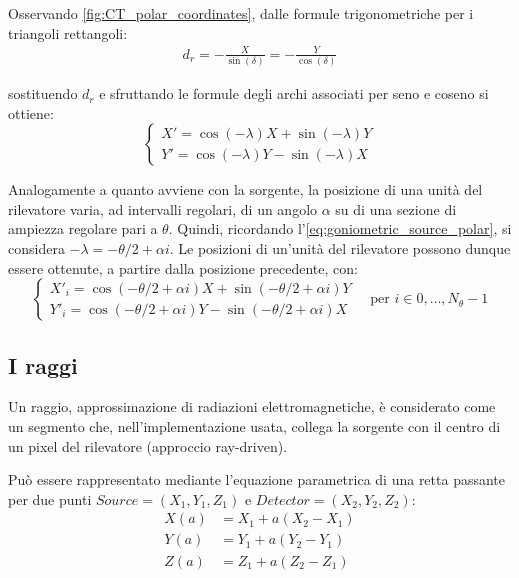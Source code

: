 \documentclass[12pt,a4paper]{report}
\begin{document}
Osservando \autoref{fig:CT_polar_coordinates}, dalle formule trigonometriche per i triangoli rettangoli:
\begin{align*}
  d_r = -\frac{X}{\sin(\delta)} = -\frac{Y}{\cos(\delta)}
\end{align*}

sostituendo \(d_r\) e sfruttando le formule degli archi associati per seno e coseno si ottiene:
\begin{equation*}
  \begin{cases}
    X' = \cos(-\lambda) X + \sin(-\lambda) Y \\
    Y' = \cos(-\lambda) Y - \sin(-\lambda) X
  \end{cases}
\end{equation*}

Analogamente a quanto avviene con la sorgente, la posizione di una unità del rilevatore varia, ad intervalli regolari, di
un angolo \(\alpha\) su di una sezione di ampiezza regolare pari a \(\theta\).
Quindi, ricordando l'\autoref{eq:goniometric_source_polar}, si considera \(-\lambda = -\theta/2 + \alpha i\).
Le posizioni di un'unità del rilevatore possono dunque essere ottenute, a partire dalla posizione precedente, con:
\begin{equation*}
  \begin{cases}
    X'_i = \cos(-\theta/2 + \alpha i) X + \sin(-\theta/2 + \alpha i) Y \\
    Y'_i = \cos(-\theta/2 + \alpha i) Y - \sin(-\theta/2 + \alpha i) X
  \end{cases} \quad \text{per } i \in 0,\dots,N_\theta - 1
\end{equation*}

\subsection{I raggi}

Un raggio, approssimazione di radiazioni elettromagnetiche, è considerato come un segmento che, nell'implementazione usata,
collega la sorgente con il centro di un pixel del rilevatore (approccio ray-driven).

Può essere rappresentato mediante l'equazione parametrica di una retta passante per due punti \(Source = (X_1, Y_1, Z_1)\) e
\(Detector = (X_2, Y_2, Z_2)\):
\begin{align*}
  X(a) &= X_1 + a (X_2 - X_1) \\
  Y(a) &= Y_1 + a (Y_2 - Y_1) \\
  Z(a) &= Z_1 + a (Z_2 - Z_1)
\end{align*}
\end{document}
